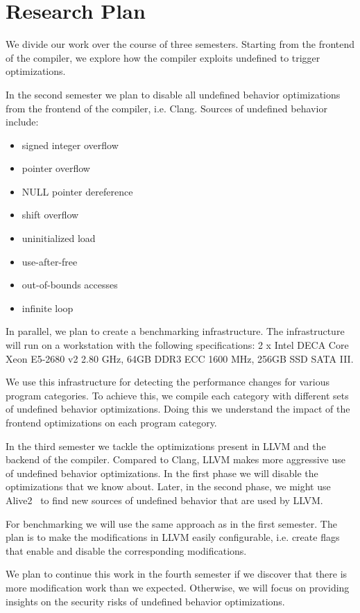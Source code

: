 \section{Research Plan} \label{sec:rp}

We divide our work over the course of three semesters. Starting from the
frontend of the compiler, we explore how the compiler exploits
undefined to trigger optimizations.

In the second semester we plan to disable all undefined behavior
optimizations from the frontend of the compiler, i.e. Clang. Sources of
undefined behavior include:
\begin{itemize}
  \item signed integer overflow
  \item pointer overflow
  \item NULL pointer dereference
  \item shift overflow
  \item uninitialized load
  \item use-after-free
  \item out-of-bounds accesses
  \item infinite loop
\end{itemize}

In parallel, we plan to create a benchmarking infrastructure. The
infrastructure will run on a workstation with the following
specifications: 2 x Intel DECA Core Xeon E5-2680 v2 2.80 GHz, 64GB DDR3
ECC 1600 MHz, 256GB SSD SATA III.

We use this infrastructure for detecting the performance changes for
various program categories. To achieve this, we compile each category
with different sets of undefined behavior optimizations. Doing this we
understand the impact of the frontend optimizations on each program
category.

In the third semester we tackle the optimizations present in LLVM and
the backend of the compiler. Compared to Clang, LLVM makes more
aggressive use of undefined behavior optimizations. In the first phase
we will disable the optimizations that we know about. Later, in the
second phase, we might use Alive2~\cite{lopes2021alive2} to find new
sources of undefined behavior that are used by LLVM.

For benchmarking we will use the same approach as in the first semester.
The plan is to make the modifications in LLVM easily configurable, i.e.
create flags that enable and disable the corresponding modifications.

We plan to continue this work in the fourth semester if we discover that
there is more modification work than we expected. Otherwise, we will
focus on providing insights on the security risks of undefined behavior
optimizations.
